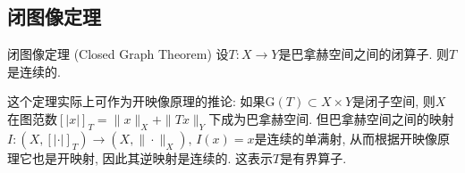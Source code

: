 \subsection{闭图像定理}
\begin{theorem}{闭图像定理 (Closed Graph Theorem)}
设$T:X\to Y$是巴拿赫空间之间的闭算子. 则$T$是连续的.
\end{theorem}
这个定理实际上可作为开映像原理的推论: 如果$\text{G}(T)\subset X\times Y$是闭子空间, 则$X$在图范数$[|x|]_T=\|x\|_X+\|Tx\|_Y$下成为巴拿赫空间. 但巴拿赫空间之间的映射$I:(X,[|\cdot|]_T)\to(X,\|\cdot\|_X),\,I(x)=x$是连续的单满射, 从而根据开映像原理它也是开映射, 因此其逆映射是连续的. 这表示$T$是有界算子.

